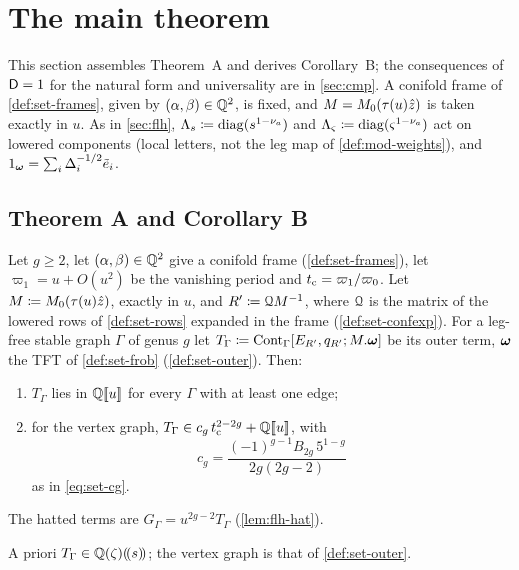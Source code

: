 \section{The main theorem}
\label{sec:mai}

This section assembles Theorem~A and derives Corollary~B; the consequences of $\mathsf{D}=1$ for the natural form and universality are in \cref{sec:cmp}. A conifold frame of \cref{def:set-frames}, given by $(\alpha,\beta)\in\mathbb{Q}^2$, is fixed, and $M=M_{0}(\tau(u)\hat{z})$ is taken exactly in $u$. As in \cref{sec:flh}, $\Lambda_s\coloneqq\operatorname{diag}(s^{1-\nu_a})$ and $\Lambda_\varsigma\coloneqq\operatorname{diag}(\varsigma^{1-\nu_a})$ act on lowered components (local letters, not the leg map of \cref{def:mod-weights}), and $1_{\boldsymbol{\omega}}=\sum_i\Delta_i^{-1/2}\tilde e_i$.

\subsection{Theorem A and Corollary B}
\label{sec:mai-thm}

\begin{thm}[Theorem A]
\label{thm:mai-main}
Let $g\geq2$, let $(\alpha,\beta)\in\mathbb{Q}^2$ give a conifold frame (\cref{def:set-frames}), let $\varpi_1=u+O(u^2)$ be the vanishing period and $t_{\mathrm{c}}=\varpi_1/\varpi_0$. Let $M\coloneqq M_{0}(\tau(u)\hat{z})$, exactly in $u$, and $R'\coloneqq\mathcal{Q} M^{-1}$, where $\mathcal{Q}$ is the matrix of the lowered rows of \cref{def:set-rows} expanded in the frame (\cref{def:set-confexp}). For a leg-free stable graph $\Gamma$ of genus $g$ let $T_\Gamma\coloneqq\mathrm{Cont}_\Gamma[E_{R'},q_{R'};M.\boldsymbol{\omega}]$ be its outer term, $\boldsymbol{\omega}$ the TFT of \cref{def:set-frob} (\cref{def:set-outer}). Then:
\begin{enumerate}
\item $T_\Gamma$ lies in $\mathbb{Q}[\![ u ]\!]$ for every $\Gamma$ with at least one edge;
\item for the vertex graph, $T_\Gamma\in c_g\,t_{\mathrm{c}}^{2-2g}+\mathbb{Q}[\![ u ]\!]$, with
\[
c_g=\frac{(-1)^{g-1}B_{2g}\,5^{1-g}}{2g(2g-2)}
\]
as in \eqref{eq:set-cg}.
\end{enumerate}
The hatted terms are $G_\Gamma=u^{2g-2}T_\Gamma$ (\cref{lem:flh-hat}).
\end{thm}

A priori $T_\Gamma\in\mathbb{Q}(\zeta)(\!(s)\!)$; the vertex graph is that of \cref{def:set-outer}.

